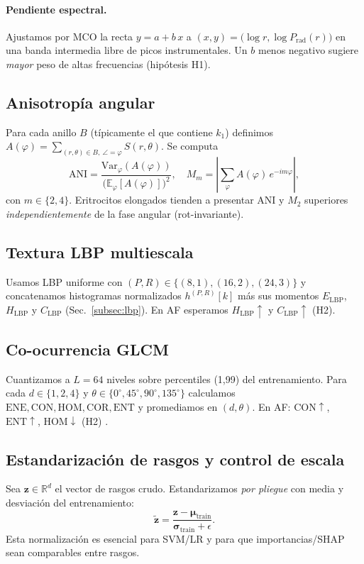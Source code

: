 \paragraph{Pendiente espectral.} Ajustamos por MCO la recta $y=a+b\,x$ a $(x,y)=\big(\log r,\log P_{\mathrm{rad}}(r)\big)$ en una banda intermedia libre de picos instrumentales. Un $b$ menos negativo sugiere \emph{mayor} peso de altas frecuencias (hipótesis H1).

\subsection{Anisotropía angular}
Para cada anillo $B$ (típicamente el que contiene $k_1$) definimos $A(\varphi)=\sum_{(r,\theta)\in B,\ \angle=\varphi}S(r,\theta)$. Se computa 
\[
\mathrm{ANI}=\frac{\mathrm{Var}_\varphi(A(\varphi))}{\big(\mathbb{E}_\varphi[A(\varphi)]\big)^2},
\quad
M_m=\left|\sum_{\varphi} A(\varphi)\,e^{-im\varphi}\right|,
\]
con $m\in\{2,4\}$. Eritrocitos elongados tienden a presentar $\mathrm{ANI}$ y $M_2$ superiores \emph{independientemente} de la fase angular (rot-invariante).

\subsection{Textura LBP multiescala}
Usamos LBP uniforme con $(P,R)\in\{(8,1),(16,2),(24,3)\}$ y concatenamos histogramas normalizados $h^{(P,R)}[k]$ más sus momentos $E_\text{LBP}$, $H_\text{LBP}$ y $C_\text{LBP}$ (Sec.~\ref{subsec:lbp}). En AF esperamos $H_\text{LBP}\!\uparrow$ y $C_\text{LBP}\!\uparrow$ (H2).

\subsection{Co-ocurrencia GLCM}
Cuantizamos a $L=64$ niveles sobre percentiles (1,99) del entrenamiento. Para cada $d\in\{1,2,4\}$ y $\theta\in\{0^\circ,45^\circ,90^\circ,135^\circ\}$ calculamos $\mathrm{ENE},\mathrm{CON},\mathrm{HOM},\mathrm{COR},\mathrm{ENT}$ y promediamos en $(d,\theta)$. En AF: $\mathrm{CON}\!\uparrow$, $\mathrm{ENT}\!\uparrow$, $\mathrm{HOM}\!\downarrow$ (H2) \cite{Kiani2022TextureSurvey}.

\subsection{Estandarización de rasgos y control de escala}
Sea $\mathbf{z}\in\mathbb{R}^d$ el vector de rasgos crudo. Estandarizamos \emph{por pliegue} con media y desviación del entrenamiento:
\[
\tilde{\mathbf{z}}=\frac{\mathbf{z}-\boldsymbol{\mu}_\text{train}}{\boldsymbol{\sigma}_\text{train}+\epsilon}.
\]
Esta normalización es esencial para SVM/LR y para que importancias/SHAP sean comparables entre rasgos. 

